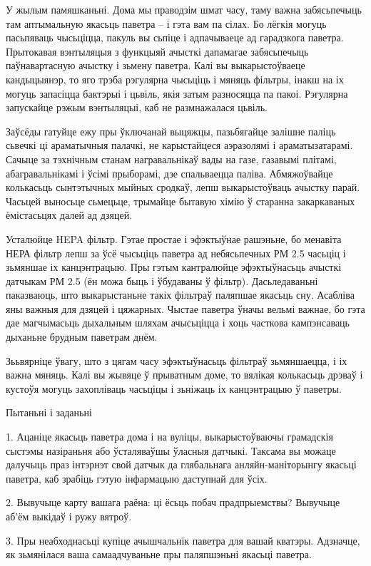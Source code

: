 У жылым памяшканьні. Дома мы праводзім шмат часу, таму важна забясьпечыць там аптымальную якасьць паветра – і гэта вам па сілах. Бо лёгкія могуць пасьпяваць чысьціцца, пакуль вы сьпіце і адпачываеце ад гарадзкога паветра. Прытокавая вэнтыляцыя з функцыяй ачысткі дапамагае забясьпечыць паўнавартасную ачыстку і зьмену паветра. Калі вы выкарыстоўваеце кандыцыянэр, то яго трэба рэгулярна чысьціць і мяняць фільтры, інакш на іх могуць запасіцца бактэрыі і цьвіль, якія затым разносяцца па пакоі. Рэгулярна запускайце рэжым вэнтыляцыі, каб не размнажалася цьвіль.

Заўсёды гатуйце ежу пры ўключанай выцяжцы, пазьбягайце залішне паліць сьвечкі ці араматычныя палачкі, не карыстайцеся аэразолямі і араматызатарамі. Сачыце за тэхнічным станам награвальнікаў вады на газе, газавымі плітамі, абагравальнікамі і ўсімі прыборамі, дзе спальваецца паліва. Абмяжоўвайце колькасьць сынтэтычных мыйных сродкаў, лепш выкарыстоўваць ачыстку парай. Часьцей выносьце сьмецьце, трымайце бытавую хімію ў старанна закаркаваных ёмістасьцях далей ад дзяцей.

Усталюйце HEPA фільтр. Гэтае простае і эфэктыўнае рашэньне, бо менавіта НЕРА фільтр лепш за ўсё чысьціць паветра ад небясьпечных РМ 2.5 часьціц і зьмяншае іх канцэнтрацыю. Пры гэтым кантралюйце эфэктыўнасьць ачысткі датчыкам РМ 2.5 (ён можа быць і ўбудаваны ў фільтр). Дасьледаваньні паказваюць, што выкарыстаньне такіх фільтраў паляпшае якасьць сну. Асабліва яны важныя для дзяцей і цяжарных. Чыстае паветра ўначы вельмі важнае, бо гэта дае магчымасьць дыхальным шляхам ачысьціцца і хоць часткова кампэнсаваць дыханьне брудным паветрам днём.

Зььвярніце ўвагу, што з цягам часу эфэктыўнасьць фільтраў зьмяншаецца, і іх важна мяняць. Калі вы жывяце ў прыватным доме, то вялікая колькасьць дрэваў і кустоўя могуць захопліваць часьціцы і зьніжаць іх канцэнтрацыю ў паветры.

Пытаньні і заданьні

1. Ацаніце якасьць паветра дома і на вуліцы, выкарыстоўваючы грамадскія сыстэмы назіраньня або ўсталяваўшы ўласныя датчыкі. Таксама вы можаце далучыць праз інтэрнэт свой датчык да глябальнага анляйн-маніторынгу якасьці паветра, каб зрабіць гэтую інфармацыю даступнай для ўсіх.

2. Вывучыце карту вашага раёна: ці ёсьць побач прадпрыемствы? Вывучыце аб'ём выкідаў і ружу вятроў.

3. Пры неабходнасьці купіце ачышчальнік паветра для вашай кватэры. Адзначце, як зьмянілася ваша самаадчуваньне пры паляпшэньні якасьці паветра.


